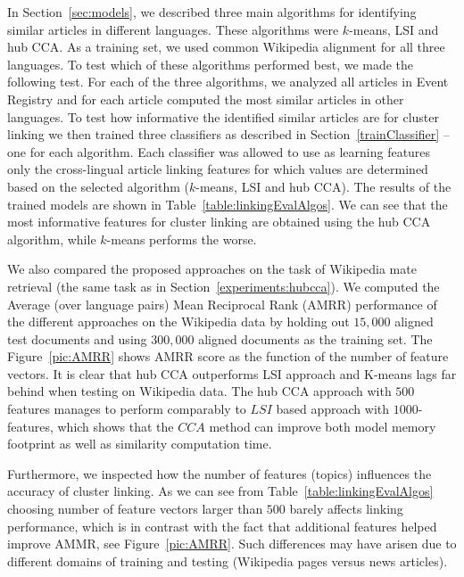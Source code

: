\documentclass[twoside,11pt]{article}
\begin{document}
In Section~\ref{sec:models}, we  described three main algorithms for identifying similar articles in different languages. These algorithms were $k$-means, LSI and hub CCA. As a training set, we used common Wikipedia alignment for all three languages. To test which of these algorithms performed best, we made the following test. For each of the three algorithms, we analyzed all articles in Event Registry and for each article computed the most similar articles in other languages. To test how informative the identified similar articles are for cluster linking we then trained three classifiers as described in Section~\ref{trainClassifier} -- one for each algorithm. Each classifier was allowed to use as learning features only the cross-lingual article linking features for which values are determined based on the selected algorithm ($k$-means, LSI and hub CCA). The results of the trained models are shown in Table~\ref{table:linkingEvalAlgos}.
We can see that the most informative features for cluster linking are obtained using the hub CCA algorithm, while $k$-means performs the worse.

We also compared the proposed approaches on the task of Wikipedia mate retrieval (the same task as in Section~\ref{experiments:hubcca}). We computed the Average (over language pairs) Mean Reciprocal Rank (AMRR)   performance of the different approaches on the  Wikipedia data by holding out $15,000$ aligned test documents and using $300,000$ aligned documents as the training set. The Figure~\ref{pic:AMRR} shows AMRR score as the function of the number of feature vectors. It is clear that hub CCA outperforms LSI approach and K-means lags far behind when testing on Wikipedia data. The hub CCA approach with $500$ features manages to perform comparably to $LSI$ based approach with $1000$-features, which shows that the $CCA$ method can improve both model memory footprint as well as similarity computation time.

Furthermore, we inspected how the number of features (topics) influences the accuracy of cluster linking. As we can see from Table~\ref{table:linkingEvalAlgos} choosing number of feature vectors larger than $500$ barely affects linking performance, which is in contrast with the fact that additional features helped improve AMMR, see Figure~\ref{pic:AMRR}. Such differences may have arisen due to different domains of training and testing (Wikipedia pages versus news articles).
\end{document}
